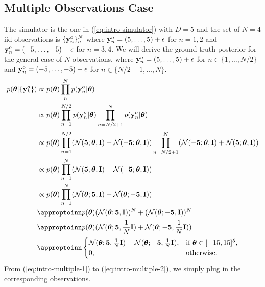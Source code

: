 \subsection{Multiple Observations Case}
The simulator is the one in (\ref{eq:intro-simulator}) with $D = 5$ and
the set of $N=4$ iid observations is $\{\mathbf{y}^o_n\}_n^N$ where $\mathbf{y}^o_n = (5, \ldots, 5) + \epsilon$ for $n = 1, 2$ and $\mathbf{y}^o_n = (-5, \ldots, -5) + \epsilon$ for $n = 3, 4$.
We will derive the ground truth posterior for the general case of $N$ observations, where $\mathbf{y}^o_n = (5, \ldots, 5) + \epsilon$ for $n \in \{1, \ldots, N/2\}$ and $\mathbf{y}^o_n = (-5, \ldots, -5) + \epsilon$ for $n \in \{N/2+1, \ldots, N\}$.
%
\begin{align}
  p(\thb|\{\data_k\})
  &\propto p(\thb) \prod_n^{N} p(\data_n | \thb) \\
  &\propto p(\thb) \prod_{n=1}^{N/2} p(\data_n | \thb) \prod_{n=N/2+1}^{N} p(\data_n | \thb) \label{eq:intro-multiple-1} \\
  &\propto p(\thb) \prod_{n=1}^{N/2} (\mathcal{N}(\mathbf{5}; \thb, \mathbf{I}) + \mathcal{N}(-\mathbf{5}; \thb, \mathbf{I})) \prod_{n=N/2+1}^{N} (\mathcal{N}(-\mathbf{5}; \thb, \mathbf{I}) + \mathcal{N}(\mathbf{5}; \thb, \mathbf{I})) \label{eq:intro-multiple-2} \\
  &\propto p(\thb) \prod_{n=1}^{N} (\mathcal{N}(\mathbf{5}; \thb, \mathbf{I}) + \mathcal{N}(-\mathbf{5}; \thb, \mathbf{I})) \label{eq:intro-multiple-3} \\
  &\propto p(\thb) \prod_{n=1}^{N} (\mathcal{N}(\thb; \mathbf{5}, \mathbf{I}) + \mathcal{N}(\thb; - \mathbf{5}, \mathbf{I})) \label{eq:intro-multiple-4} \\
  &\appropto p(\thb) ( \mathcal{N}(\thb; \mathbf{5}, \mathbf{I}) )^N + ( \mathcal{N}( \thb; - \mathbf{5}, \mathbf{I}) )^N \label{eq:intro-multiple-5} \\
  &\appropto p(\thb) ( \mathcal{N}(\thb; \mathbf{5}, \frac{1}{N}\mathbf{I} ) + \mathcal{N}(\thb; - \mathbf{5}, \frac{1}{N}\mathbf{I} ) ) \label{eq:intro-multiple-6} \\
  &\appropto
  \begin{cases}
    \mathcal{N}(\thb; \mathbf{5}, \frac{1}{N}\mathbf{I} ) + \mathcal{N}(\thb; - \mathbf{5}, \frac{1}{N}\mathbf{I} ), & \text{if } \thb \in [-15, 15]^5, \\
    0, & \text{otherwise}.
  \end{cases}
  \label{eq:intro-multiple}
\end{align}
%
From (\ref{eq:intro-multiple-1}) to (\ref{eq:intro-multiple-2}), we simply plug in the corresponding observations.
